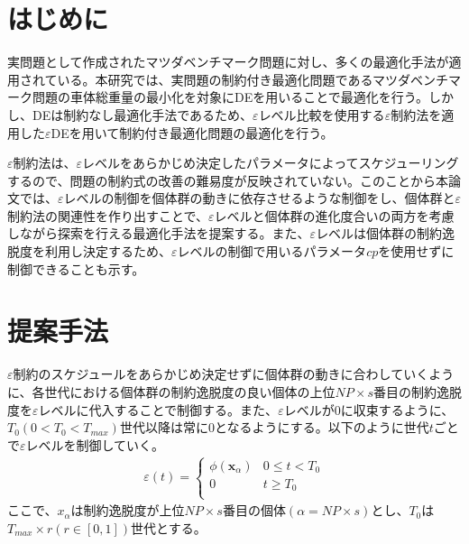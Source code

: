 \documentclass[a4paper,twocolumn,10pt]{jarticle}
\begin{document}



\section{はじめに}
実問題として作成されたマツダベンチマーク問題\cite{マツダベンチマーク問題}に対し、多くの最適化手法が適用されている。本研究では、実問題の制約付き最適化問題であるマツダベンチマーク問題の車体総重量の最小化を対象にDEを用いることで最適化を行う。しかし、DEは制約なし最適化手法であるため、$\varepsilon$レベル比較を使用する$\varepsilon$制約法\cite{ε制約法}を適用した$\varepsilon$DEを用いて制約付き最適化問題の最適化を行う。

$\varepsilon$制約法は、$\varepsilon$レベルをあらかじめ決定したパラメータによってスケジューリングするので、問題の制約式の改善の難易度が反映されていない。このことから本論文では、$\varepsilon$レベルの制御を個体群の動きに依存させるような制御をし、個体群と$\varepsilon$制約法の関連性を作り出すことで、$\varepsilon$レベルと個体群の進化度合いの両方を考慮しながら探索を行える最適化手法を提案する。また、$\varepsilon$レベルは個体群の制約逸脱度を利用し決定するため、$\varepsilon$レベルの制御で用いるパラメータ$cp$を使用せずに制御できることも示す。

\section{提案手法}
$\varepsilon$制約のスケジュールをあらかじめ決定せずに個体群の動きに合わしていくように、各世代における個体群の制約逸脱度の良い個体の上位$NP×s$番目の制約逸脱度を$\varepsilon$レベルに代入することで制御する。また、$\varepsilon$レベルが$0$に収束するように、${T}_0(0<{T}_0<{T}_{max})$世代以降は常に$0$となるようにする。以下のように世代$t$ごとで$\varepsilon$レベルを制御していく。
\begin{eqnarray}
\varepsilon(t)=
\left\{
\begin{array}{cc}
    {\phi({\bm x}_α)} & \mbox{$0\leq t<{T}_0$} \\
    {0} & \mbox{$t\geq{T}_0$}\\
\end{array}
\right.
\label{提案手法}
\end{eqnarray}
ここで、${x}_α$は制約逸脱度が上位$NP×s$番目の個体$(α=NP×s)$とし、${T}_0$は${T}_{max}\times{r}(r\in[0,1])$世代とする。
\end{document}
